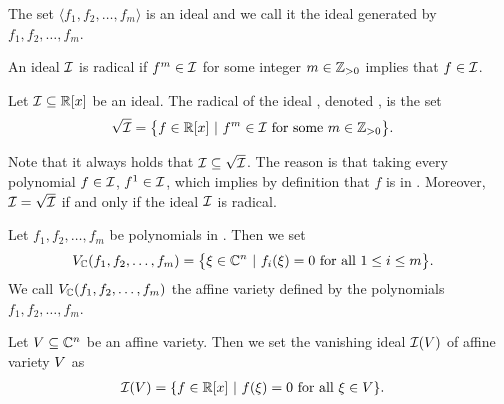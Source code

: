 The set $\langle f_1, f_2, \ldots, f_m\rangle$ is an ideal and we call it the ideal generated by $f_1, f_2, \ldots, f_m$.

\begin{definition}
  An ideal $\mathcal{I}$ is radical if $f^m \in \mathcal{I}$ for some integer $m \in\mathbb{Z}_{>0}$ implies that $f \in \mathcal{I}$.
\end{definition}

\begin{definition}
  Let $\mathcal{I} \subseteq \mathbb{R}[x]$ be an ideal.
  The radical of the ideal \Ideal, denoted \rIdeal, is the set
  \begin{align}
    \sqrt{\mathcal{I}} &= \big\{f\in\mathbb{R}[x]\ |\ f^m\in \mathcal{I} \text{ for some } m\in\mathbb{Z}_{>0}\big\}.
  \end{align}
\end{definition}


Note that it always holds that $\mathcal{I} \subseteq \sqrt{\mathcal{I}}$.
The reason is that taking every polynomial $f \in \mathcal{I}$, \ie{} $f^1 \in \mathcal{I}$, which implies by definition that $f$ is in \rIdeal.
Moreover, $\mathcal{I} = \sqrt{\mathcal{I}}$ if and only if the ideal $\mathcal{I}$ is radical.

\begin{definition}
  Let $f_1, f_2, \ldots, f_m$ be polynomials in \Rx.
  Then we set
  \begin{align}
    V_{\mathbb{C}}(f_1, f_2, \ldots, f_m) &= \big\{\xi \in \mathbb{C}^n\ |\ f_i(\xi) = 0\text{ for all }1 \leq i \leq m\big\}.
  \end{align}
  We call $V_{\mathbb{C}}(f_1, f_2, \ldots, f_m)$ the affine variety defined by the polynomials $f_1, f_2, \ldots, f_m$.
\end{definition}


\begin{definition}
  Let $V \subseteq \mathbb{C}^n$ be an affine variety. Then we set the vanishing ideal $\mathcal{I}(V)$ of affine variety $V$ as
  \begin{align}
    \mathcal{I}(V) &= \{f \in \mathbb{R}[x] \ |\ f(\xi) = 0 \text{ for all } \xi \in V\}.
  \end{align}

\end{definition}

